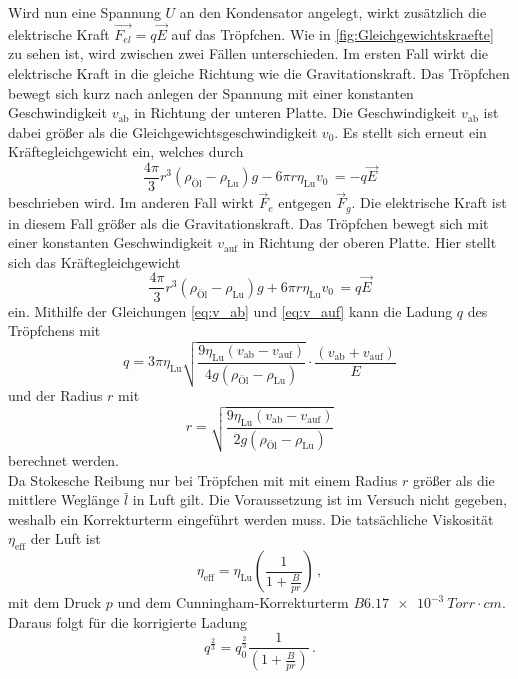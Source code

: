 Wird nun eine Spannung $U$ an den Kondensator angelegt, wirkt zusätzlich die elektrische Kraft $\vec{F_{el}} = q \vec{E}$ auf das Tröpfchen.
Wie in \autoref{fig:Gleichgewichtskraefte} zu sehen ist, wird zwischen zwei Fällen unterschieden.
Im ersten Fall wirkt die elektrische Kraft in die gleiche Richtung wie die Gravitationskraft.
Das Tröpfchen bewegt sich kurz nach anlegen der Spannung mit einer konstanten Geschwindigkeit $v_{\text{ab}}$ in Richtung der unteren Platte.
Die Geschwindigkeit $v_{\text{ab}}$ ist dabei größer als die Gleichgewichtsgeschwindigkeit $v_0$.
Es stellt sich erneut ein Kräftegleichgewicht ein, welches durch
\begin{equation}\label{eq:v_ab}
    \frac{4 \pi}{3}r^3 \left(\rho_{\text{Öl}} - \rho_{\text{Lu}}\right) g - 6 \pi r \eta_{\text{Lu}} v_0 \, = -q\vec{E}
\end{equation} 
beschrieben wird.
Im anderen Fall wirkt $\vec{F}_e$ entgegen $\vec{F}_g$.
Die elektrische Kraft ist in diesem Fall größer als die Gravitationskraft.
Das Tröpfchen bewegt sich mit einer konstanten Geschwindigkeit $v_{\text{auf}}$ in Richtung der oberen Platte.
Hier stellt sich das Kräftegleichgewicht
\begin{equation}\label{eq:v_auf}
    \frac{4 \pi}{3}r^3 \left(\rho_{\text{Öl}} - \rho_{\text{Lu}}\right) g + 6 \pi r \eta_{\text{Lu}} v_0 \, = q\vec{E}
\end{equation}
ein.
Mithilfe der Gleichungen \eqref{eq:v_ab} und \eqref{eq:v_auf} kann die Ladung $q$ des Tröpfchens mit
\begin{equation*}
    q = 3 \pi \eta_{\text{Lu}} \sqrt{\frac{9 \eta_{\text{Lu}} (v_{\text{ab}} - v_{\text{auf}})}{4 g \left(\rho_{\text{Öl}} - \rho_{\text{Lu}}\right)}} \cdot \frac{\left(v_{\text{ab}} + v_{\text{auf}}\right)}{E}
\end{equation*}
und der Radius $r$ mit
\begin{equation*}
    r = \sqrt{\frac{9 \eta_{\text{Lu}} (v_{\text{ab}} - v_{\text{auf}})}{2 g \left(\rho_{\text{Öl}} - \rho_{\text{Lu}}\right)}}
\end{equation*}
berechnet werden.\\
Da Stokesche Reibung nur bei Tröpfchen mit mit einem Radius $r$ größer als die mittlere Weglänge $\bar{l}$ in Luft gilt.
Die Voraussetzung ist im Versuch nicht gegeben, weshalb ein Korrekturterm eingeführt werden muss.
Die tatsächliche Viskosität $\eta_{\text{eff}}$ der Luft ist
\begin{equation*}
    \eta_{\text{eff}} = \eta_{\text{Lu}} \left(\frac{1}{1 + \frac{B}{pr}}\right) \, ,
\end{equation*}
mit dem Druck $p$ und dem Cunningham-Korrekturterm $B \SI{6.17e-3}{Torr\cdot cm}$.
Daraus folgt für die korrigierte Ladung
\begin{equation*}
    q^{\frac{2}{3}} = q_0^{\frac{2}{3}} \frac{1}{\left(1 + \frac{B}{pr}\right)} \, .
\end{equation*}